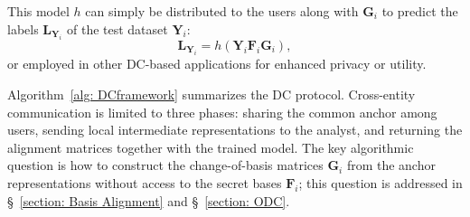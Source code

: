 \documentclass[final,3p,times]{elsarticle}
\theoremstyle{plain}
\newcommand{\matr}[1]{\bm{#1}}        %
\begin{document}
This model \( h \) can simply be distributed to the users along with \( \matr{G}_i \) to predict the labels \( \matr{L}_{\matr{Y}_i} \) of the test dataset \( \matr{Y}_i \):
\begin{equation}
\label{eq: inference}
\matr{L}_{\matr{Y}_i} = h(\matr{Y}_i \matr{F}_i \matr{G}_i),
\end{equation}
or employed in other DC-based applications \cite{NRI-DC, DCapp1, DCapp2, DCapp3, DCapp4, DCapp5, DCrecommender} for enhanced privacy or utility. 

Algorithm~\ref{alg: DCframework} summarizes the DC protocol. Cross-entity communication is limited to three phases: sharing the common anchor among users, sending local intermediate representations to the analyst, and returning the alignment matrices together with the trained model. The key algorithmic question is how to construct the change-of-basis matrices $\matr{G}_i$ from the anchor representations without access to the secret bases $\matr{F}_i$; this question is addressed in \S~\ref{section: Basis Alignment} and \S~\ref{section: ODC}.
\end{document}
